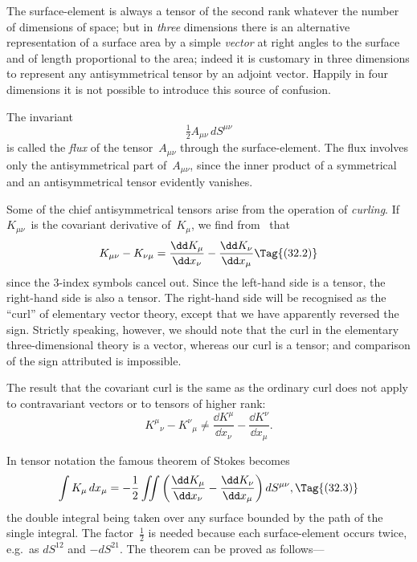 \documentclass[12pt]{book}
\begin{document}
The surface-element is always a tensor of the second rank whatever the
number of dimensions of space; but in \emph{three} dimensions there is an alternative
representation of a surface area by a simple \emph{vector} at right angles to the
surface and of length proportional to the area; indeed it is customary in three
dimensions to represent any antisymmetrical tensor by an adjoint vector.
Happily in four dimensions it is not possible to introduce this source of
confusion.

The invariant
\[
\tfrac{1}{2} A_{\mu\nu}\, dS^{\mu\nu}
\]
is called the \emph{flux} of the tensor~$A_{\mu\nu}$ through the surface-element. The flux
%
involves only the antisymmetrical part of~$A_{\mu\nu}$, since the inner product of a
symmetrical and an antisymmetrical tensor evidently vanishes.

Some of the chief antisymmetrical tensors arise from the operation of
\emph{curling}. If $K_{\mu\nu}$~is the covariant derivative of~$K_{\mu}$, we find from~ that
\[
K_{\mu\nu} - K_{\nu\mu} = \frac{\dd K_{\mu}}{\dd x_{\nu}} - \frac{\dd K_{\nu}}{\dd x_{\mu}}
\Tag{(32.2)}
\]
since the $3$-index symbols cancel out. Since the left-hand side is a tensor, the
right-hand side is also a tensor. The right-hand side will be recognised as the
``curl'' of elementary vector theory, except that we have apparently reversed
%
the sign. Strictly speaking, however, we should note that the curl in the
elementary three-dimensional theory is a vector, whereas our curl is a tensor;
and comparison of the sign attributed is impossible.

The result that the covariant curl is the same as the ordinary curl does
not apply to contravariant vectors or to tensors of higher rank:
\[
{K^{\mu}}_{\nu} - {K^{\nu}}_{\mu} \neq \frac{\dd K^{\mu}}{\dd x_{\nu}} - \frac{\dd K^{\nu}}{\dd x_{\mu}}.
\]

In tensor notation the famous theorem of Stokes becomes
%
\[
\int K_{\mu}\, dx_{\mu} = -\frac{1}{2} \iint \left(\frac{\dd K_{\mu}}{\dd x_{\nu}} - \frac{\dd K_{\nu}}{\dd x_{\mu}}\right) dS^{\mu\nu},
\Tag{(32.3)}
\]
the double integral being taken over any surface bounded by the path of the
single integral. The factor~$\frac{1}{2}$ is needed because each surface-element occurs
twice, e.g.\ as $dS^{12}$ and $-dS^{21}$. The theorem can be proved as follows---
\end{document}
